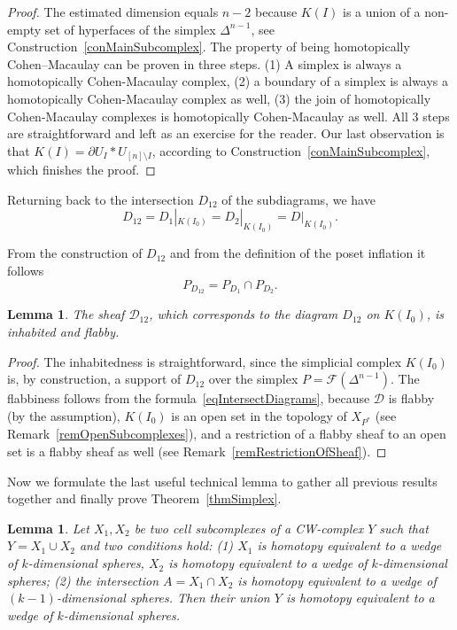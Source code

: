 \documentclass[english,12pt,oneside]{amsproc}
\newcommand{\ca}[1]{\mathcal{#1}}
\newcommand{\dd}{\partial}
\newcounter{stmcounter}[section]
\numberwithin{equation}{section}
\theoremstyle{plain}
\newtheorem{lem}[stmcounter]{Lemma}
\theoremstyle{definition}
\theoremstyle{remark}
\begin{document}
\begin{proof}
The estimated dimension equals $n-2$ because $K(I)$ is a union of a non-empty set of hyperfaces of the simplex $\Delta^{n-1}$, see Construction~\ref{conMainSubcomplex}. The property of being homotopically Cohen–Macaulay can be proven in three steps. (1) A simplex is always a homotopically Cohen-Macaulay complex, (2) a boundary of a simplex is always a homotopically Cohen-Macaulay complex as well, (3) the join of homotopically Cohen-Macaulay complexes is homotopically Cohen-Macaulay as well. All 3 steps are straightforward and left as an exercise for the reader. Our last observation is that $K(I)=\dd U_{I}\ast U_{[n]\setminus I}$, according to Construction~\ref{conMainSubcomplex}, which finishes the proof.
\end{proof}

Returning back to the intersection $D_{12}$ of the subdiagrams, we have
\begin{equation}\label{eqIntersectDiagrams}
D_{12}=D_1|_{K(I_0)}=D_2|_{K(I_0)}=D|_{K(I_0)}.
\end{equation}

From the construction of $D_{12}$ and from the definition of the poset inflation it follows
\begin{equation}\label{eqPosetIntersection}
P_{D_{12}}=P_{D_1}\cap P_{D_2}.
\end{equation}


\begin{lem}\label{lemIntersectionFlabby}
The sheaf $\ca{D}_{12}$, which corresponds to the diagram $D_{12}$ on $K(I_0)$, is inhabited and flabby.
\end{lem}

\begin{proof}
The inhabitedness is straightforward, since the simplicial complex $K(I_0)$ is, by construction, a support of $D_{12}$ over the simplex $P=\ca{F}(\Delta^{n-1})$. The flabbiness follows from the formula~\eqref{eqIntersectDiagrams}, because $\ca{D}$ is flabby (by the assumption), $K(I_0)$ is an open set in the topology of $X_{P^*}$ (see Remark~\ref{remOpenSubcomplexes}), and a restriction of a flabby sheaf to an open set is a flabby sheaf as well (see Remark~\ref{remRestrictionOfSheaf}).
\end{proof}

Now we formulate the last useful technical lemma to gather all previous results together and finally prove Theorem~\ref{thmSimplex}.

\begin{lem}\label{lemInductionHomotopy}
Let $X_1,X_2$ be two cell subcomplexes of a CW-complex $Y$ such that $Y=X_1\cup X_2$ and two conditions hold: (1) $X_1$ is homotopy equivalent to a wedge of $k$-dimensional spheres,  $X_2$ is homotopy equivalent to a wedge of $k$-dimensional spheres; (2) the intersection $A=X_1\cap X_2$ is homotopy equivalent to a wedge of $(k-1)$-dimensional spheres. Then their union $Y$ is homotopy equivalent to a wedge of $k$-dimensional spheres.
\end{lem}
\end{document}
